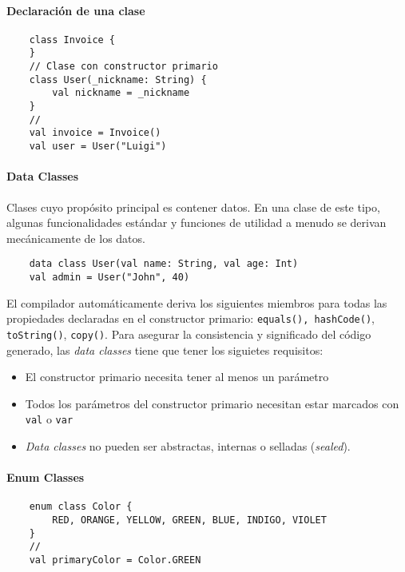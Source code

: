 \paragraph{Declaración de una clase}
\begin{verbatim}
    class Invoice {
    }
    // Clase con constructor primario
    class User(_nickname: String) {
        val nickname = _nickname
    }
    // 
    val invoice = Invoice()
    val user = User("Luigi")    
\end{verbatim}

\paragraph{Data Classes} Clases cuyo propósito principal es contener datos. En una clase de este tipo, algunas funcionalidades estándar y funciones de utilidad a menudo se derivan mecánicamente de los datos.
\begin{verbatim}
    data class User(val name: String, val age: Int)
    val admin = User("John", 40)
\end{verbatim}

El compilador automáticamente deriva los siguientes miembros para todas las propiedades declaradas en el constructor primario: \texttt{equals(), hashCode()}, \texttt{toString()}, \texttt{copy()}. Para asegurar la consistencia y significado del código generado, las \emph{data classes} tiene que tener los siguietes requisitos:
\begin{itemize}
    \item El constructor primario necesita tener al menos un parámetro
    \item Todos los parámetros del constructor primario necesitan estar marcados con \texttt{val} o \texttt{var}
    \item \emph{Data classes} no pueden ser abstractas, internas o selladas (\emph{sealed}).
\end{itemize}

\paragraph{Enum Classes}
\begin{verbatim}
    enum class Color {
        RED, ORANGE, YELLOW, GREEN, BLUE, INDIGO, VIOLET
    }
    //
    val primaryColor = Color.GREEN
\end{verbatim}

